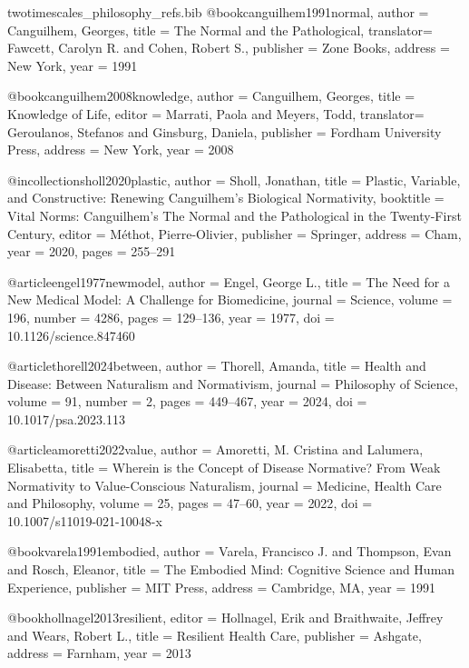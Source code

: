 
\begin{filecontents*}{twotimescales_philosophy_refs.bib}
@book{canguilhem1991normal,
  author    = {Canguilhem, Georges},
  title     = {The Normal and the Pathological},
  translator= {Fawcett, Carolyn R. and Cohen, Robert S.},
  publisher = {Zone Books},
  address   = {New York},
  year      = {1991}
}

@book{canguilhem2008knowledge,
  author    = {Canguilhem, Georges},
  title     = {Knowledge of Life},
  editor    = {Marrati, Paola and Meyers, Todd},
  translator= {Geroulanos, Stefanos and Ginsburg, Daniela},
  publisher = {Fordham University Press},
  address   = {New York},
  year      = {2008}
}

@incollection{sholl2020plastic,
  author    = {Sholl, Jonathan},
  title     = {Plastic, Variable, and Constructive: Renewing Canguilhem's Biological Normativity},
  booktitle = {Vital Norms: Canguilhem's The Normal and the Pathological in the Twenty-First Century},
  editor    = {M{\'e}thot, Pierre-Olivier},
  publisher = {Springer},
  address   = {Cham},
  year      = {2020},
  pages     = {255--291}
}

@article{engel1977newmodel,
  author  = {Engel, George L.},
  title   = {The Need for a New Medical Model: A Challenge for Biomedicine},
  journal = {Science},
  volume  = {196},
  number  = {4286},
  pages   = {129--136},
  year    = {1977},
  doi     = {10.1126/science.847460}
}

@article{thorell2024between,
  author  = {Thorell, Amanda},
  title   = {Health and Disease: Between Naturalism and Normativism},
  journal = {Philosophy of Science},
  volume  = {91},
  number  = {2},
  pages   = {449--467},
  year    = {2024},
  doi     = {10.1017/psa.2023.113}
}

@article{amoretti2022value,
  author  = {Amoretti, M. Cristina and Lalumera, Elisabetta},
  title   = {Wherein is the Concept of Disease Normative? From Weak Normativity to Value-Conscious Naturalism},
  journal = {Medicine, Health Care and Philosophy},
  volume  = {25},
  pages   = {47--60},
  year    = {2022},
  doi     = {10.1007/s11019-021-10048-x}
}

@book{varela1991embodied,
  author    = {Varela, Francisco J. and Thompson, Evan and Rosch, Eleanor},
  title     = {The Embodied Mind: Cognitive Science and Human Experience},
  publisher = {MIT Press},
  address   = {Cambridge, MA},
  year      = {1991}
}

@book{hollnagel2013resilient,
  editor    = {Hollnagel, Erik and Braithwaite, Jeffrey and Wears, Robert L.},
  title     = {Resilient Health Care},
  publisher = {Ashgate},
  address   = {Farnham},
  year      = {2013}
}


\end{filecontents*}
